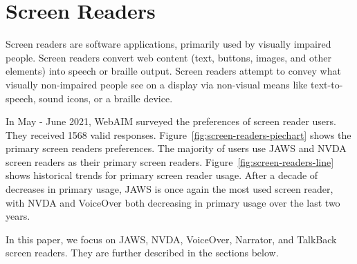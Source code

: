%
%
% 
% 
% 


\chapter{Screen Readers}

\label{chap:Intro}



Screen readers are software applications, primarily used by visually impaired people. Screen readers convert web content (text, buttons, images, and other elements) into speech or braille output. Screen readers attempt to convey what visually non-impaired people see on a display via non-visual means like text-to-speech, sound icons, or a braille device.

In May - June 2021, WebAIM surveyed the  preferences of screen reader users. They received 1568 valid responses. Figure~\ref{fig:screen-readers-piechart} shows the primary screen readers preferences. The majority of users use JAWS and NVDA screen readers as their primary screen readers. Figure~\ref{fig:screen-readers-line} shows historical trends for primary screen reader usage. After a decade of decreases in primary usage, JAWS is once again the most used screen reader, with NVDA and VoiceOver both decreasing in primary usage over the last two years.

In this paper, we focus on JAWS, NVDA, VoiceOver, Narrator, and TalkBack screen readers. They are further described in the sections below.

